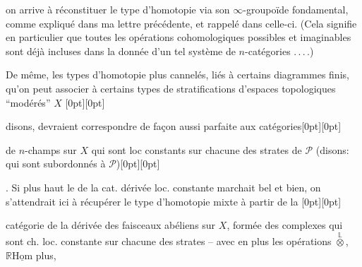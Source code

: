 %
on arrive à réconstituer le type d'homotopie
via son $\infty$-groupoïde fondamental, comme
expliqué dans ma lettre précédente, et
rappelé dans celle-ci. (Cela signifie en
particulier que toutes les opérations cohomologiques
possibles et imaginables sont
déjà incluses dans la donnée d'un
tel système de $n$-catégories .\,.\,.\,.) 

De même, les types d'homotopie plus
cannelés, liés à certains diagrammes finis,
qu'on peut associer à certains types
de stratifications  d'espaces topologiques
``modérés'' $X$ \raisebox{0pt}[0pt][0pt]{\parbox[t][0pt][t]{0pt}{}}disons, devraient correspondre de
façon aussi parfaite aux catégories\raisebox{0pt}[0pt][0pt]{\parbox[t][0pt][t]{0pt}{}} de $n$-champs
sur $X$ qui sont loc constants sur chacune des
strates de $\mathcal P$ (disons: qui sont subordonnés à $\mathcal P$)\raisebox{0pt}[0pt][0pt]{\parbox[t][0pt][t]{0pt}{}}.
Si plus haut le  de la cat. dérivée loc.
constante marchait bel et bien, on s'attendrait
ici à récupérer le type d'homotopie
mixte à partir de la \raisebox{0pt}[0pt][0pt]{\parbox[t][0pt][t]{0pt}{}}catégorie de la 
dérivée des faisceaux abéliens sur $X$,
formée des complexes qui sont  ch. loc.
constante sur chacune des strates -- avec
en plus les opérations $\overset{\mathbb L}{\otimes}$, $\mathbb R\underline{\mathrm{Hom}}$ plus, 
